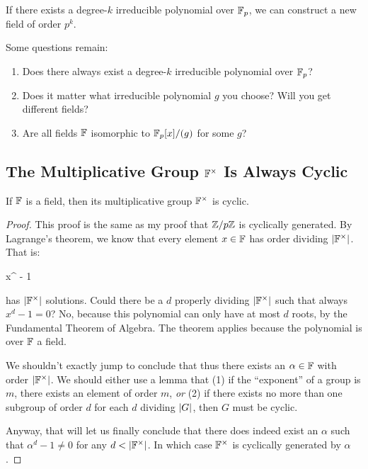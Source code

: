 \begin{corollary}
  If there exists a degree-$k$ irreducible polynomial over $\mathbb{F}_p$, we can
  construct a new field of order $p^k$.
\end{corollary}

\begin{remark}
  Some questions remain:

  \begin{enumerate}
    \item Does there always exist a degree-$k$ irreducible polynomial
    over $\mathbb{F}_p$?

    \item Does it matter what irreducible polynomial $g$ you choose?
    Will you get different fields?

    \item Are all fields $\mathbb{F}$ isomorphic to $\mathbb{F}_p[x]/(g)$ for some $g$?
  \end{enumerate}
\end{remark}

\subsection{The Multiplicative Group $\mathbb{F}^\times$ Is Always Cyclic}

\begin{theorem}
  If $\mathbb{F}$ is a field, then its multiplicative group $\mathbb{F}^\times$ is
  cyclic.
\end{theorem}

\begin{proof}
  This proof is the same as my proof that $\mathbb{Z} / p\mathbb{Z}$ is cyclically
  generated. By Lagrange's theorem, we know that every element $x\in\mathbb{F}$
  has order dividing $|\mathbb{F}^\times|$. That is:

  \begin{nedqn}
    x^{\order{\F^\times}} - 1
  \end{nedqn}

  \noindent
  has $|\mathbb{F}^\times|$ solutions. Could there be a $d$ properly
  dividing $|\mathbb{F}^\times|$ such that always $x^d - 1 = 0$? No,
  because this polynomial can only have at most $d$ roots, by the
  Fundamental Theorem of Algebra. The theorem applies because the
  polynomial is over $\mathbb{F}$ a field.

  We shouldn't exactly jump to conclude that thus there exists an
  $\alpha\in\mathbb{F}$ with order $|\mathbb{F}^\times|$. We should either use a
  lemma that (1) if the ``exponent'' of a group is $m$, there exists an
  element of order $m$, \emph{or} (2) if there exists no more than one
  subgroup of order $d$ for each $d$ dividing $|G|$, then $G$ must
  be cyclic.

  Anyway, that will let us finally conclude that there does indeed exist
  an $\alpha$ such that $\alpha^d - 1 \ne 0$ for any $d <
  |\mathbb{F}^\times|$. In which case $\mathbb{F}^\times$ is cyclically generated
  by $\alpha$.
\end{proof}

